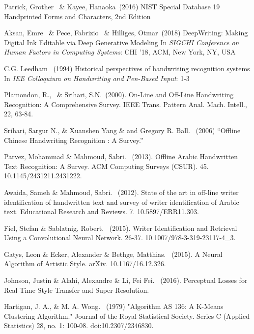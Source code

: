 \documentclass{article}
\begin{document}
\begin{thebibliography}{99}
   Patrick, Grother \ \&  Kayee, Hanaoka\ (2016) NIST Special Database 19 Handprinted Forms and Characters, 2nd Edition

   Aksan, Emre \ \& Pece, Fabrizio \ \& Hilliges, Otmar\ (2018) DeepWriting: Making Digital Ink Editable via Deep Generative Modeling
  In {\itshape SIGCHI Conference on Human Factors in Computing Systems}: CHI '18, ACM, New York, NY, USA

   C.G. Leedham \ (1994) Historical perspectives of handwriting recognition systems
  In {\itshape IEE Colloquium on Handwriting and Pen-Based Input}: 1-3

   Plamondon, R., \ \& Srihari, S.N.\ (2000).
  On-Line and Off-Line Handwriting Recognition: A Comprehensive Survey. IEEE Trans. Pattern Anal. Mach. Intell., 22, 63-84.

   Srihari, Sargur N., \& Xuanshen Yang \& and Gregory R. Ball. \ (2006) “Offline Chinese Handwriting Recognition : A Survey.”

   Parvez, Mohammad \&  Mahmoud, Sabri. \ (2013). Offline Arabic Handwritten Text Recognition: A Survey. ACM Computing Surveys (CSUR). 45. 10.1145/2431211.2431222.

   Awaida, Sameh \& Mahmoud, Sabri. \ (2012). State of the art in off-line writer identification of handwritten text and survey of writer identification of Arabic text. Educational Research and Reviews. 7. 10.5897/ERR11.303.

   Fiel, Stefan \& Sablatnig, Robert. \ (2015). Writer Identification and Retrieval Using a Convolutional Neural Network. 26-37. 10.1007/978-3-319-23117-4\_3.

   Gatys, Leon \& Ecker, Alexander \& Bethge, Matthias. \ (2015). A Neural Algorithm of Artistic Style. arXiv. 10.1167/16.12.326.

   Johnson, Justin \& Alahi, Alexandre \& Li, Fei Fei. \ (2016). Perceptual Losses for Real-Time Style Transfer and Super-Resolution.

   Hartigan, J. A., \& M. A. Wong. \ (1979) "Algorithm AS 136: A K-Means Clustering Algorithm." Journal of the Royal Statistical Society. Series C (Applied Statistics) 28, no. 1: 100-08. doi:10.2307/2346830.


\end{thebibliography}
\end{document}
